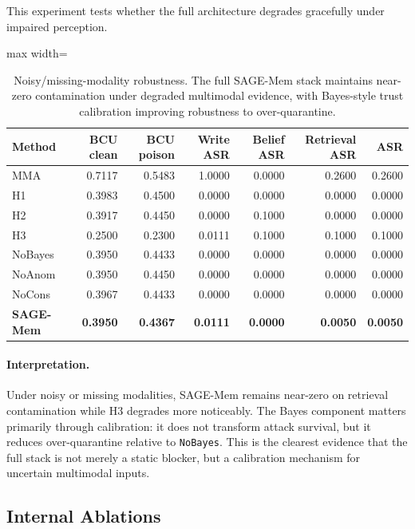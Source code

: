 \documentclass{article}
\begin{document}
This experiment tests whether the full architecture degrades gracefully under impaired perception.

\begin{table}[t]
\centering
\small
\setlength{\tabcolsep}{3.5pt}
\renewcommand{\arraystretch}{0.96}
\begin{adjustbox}{max width=\columnwidth}
\begin{tabular}{lrrrrrr}
\toprule
Method & BCU clean & BCU poison & Write ASR & Belief ASR & Retrieval ASR & ASR \\
\midrule
MMA & 0.7117 & 0.5483 & 1.0000 & 0.0000 & 0.2600 & 0.2600 \\
H1 & 0.3983 & 0.4500 & 0.0000 & 0.0000 & 0.0000 & 0.0000 \\
H2 & 0.3917 & 0.4450 & 0.0000 & 0.1000 & 0.0000 & 0.0000 \\
H3 & 0.2500 & 0.2300 & 0.0111 & 0.1000 & 0.1000 & 0.1000 \\
NoBayes & 0.3950 & 0.4433 & 0.0000 & 0.0000 & 0.0000 & 0.0000 \\
NoAnom & 0.3950 & 0.4450 & 0.0000 & 0.0000 & 0.0000 & 0.0000 \\
NoCons & 0.3967 & 0.4433 & 0.0000 & 0.0000 & 0.0000 & 0.0000 \\
\textbf{SAGE-Mem} & \textbf{0.3950} & \textbf{0.4367} & \textbf{0.0111} & \textbf{0.0000} & \textbf{0.0050} & \textbf{0.0050} \\
\bottomrule
\end{tabular}
\end{adjustbox}
\caption{Noisy/missing-modality robustness. The full SAGE-Mem stack maintains near-zero contamination under degraded multimodal evidence, with Bayes-style trust calibration improving robustness to over-quarantine.}
\label{tab:locomo-noisy}
\end{table}


\paragraph{Interpretation.}
Under noisy or missing modalities, SAGE-Mem remains near-zero on retrieval contamination while H3 degrades more noticeably. The Bayes component matters primarily through calibration: it does not transform attack survival, but it reduces over-quarantine relative to \texttt{NoBayes}. This is the clearest evidence that the full stack is not merely a static blocker, but a calibration mechanism for uncertain multimodal inputs.

\subsection{Internal Ablations}
\end{document}
